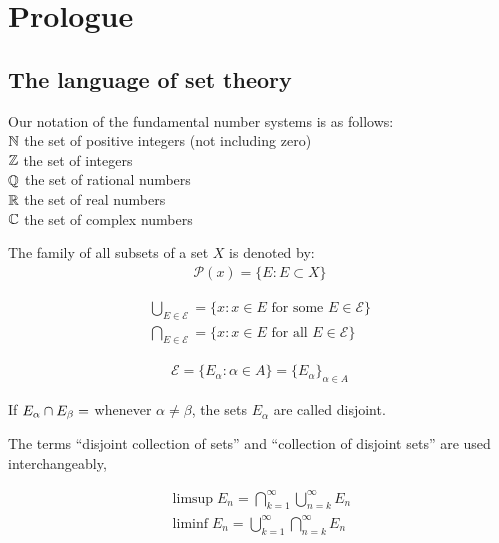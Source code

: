 
\setchapterpreamble[u]{\margintoc}
\chapter{Prologue}

\section{The language of set theory}

\begin{definition}
Our notation of the fundamental number systems is as follows: \\
$\mathbb{N}$ the set of positive integers (not including zero) \\
$\mathbb{Z}$ the set of integers \\
$\mathbb{Q}$ the set of rational numbers \\
$\mathbb{R}$ the set of real numbers \\
$\mathbb{C}$ the set of complex numbers
\end{definition}

The family of all subsets of a set $X$ is denoted by:
\begin{align}
\mathcal{P}(x) = \{ E : E \subset X \}
\end{align}

\begin{align}
\bigcup_{E \in \mathcal{E}} = \{ x : x\in E \text{ for some } E \in \mathcal{E} \} \\
\bigcap_{E \in \mathcal{E}} = \{ x : x\in E \text{ for all } E \in \mathcal{E} \}
\end{align}

\begin{align}
\mathcal{E} = \{ E_{\alpha} : \alpha \in A \} = \{E_{\alpha}\}_{\alpha \in A}
\end{align}

If $E_{\alpha} \cap E_{\beta} = \empty$ whenever $\alpha \ne \beta$, the sets $E_{\alpha}$ are called disjoint.

The terms ``disjoint collection of sets'' and ``collection of disjoint sets'' are used interchangeably,

\begin{align}
\limsup E_n = \bigcap_{k=1}^{\infty} \bigcup_{n=k}^{\infty} E_n \\
\liminf E_n = \bigcup_{k=1}^{\infty} \bigcap_{n=k}^{\infty} E_n
\end{align}

